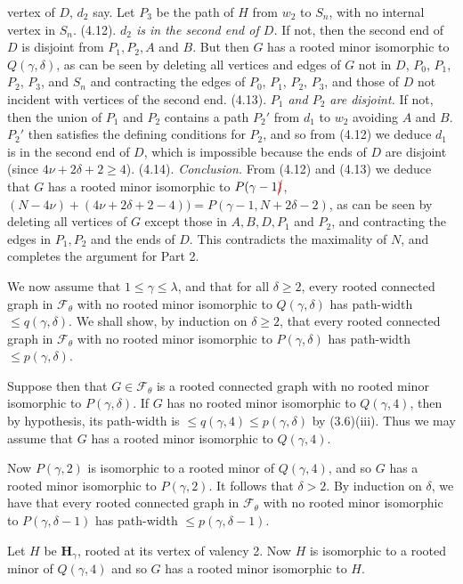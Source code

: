 \noindent vertex of $D$, $d_2$ say. Let $P_3$ be the path of $H$ from $w_2$ to $S_n$, with no internal
vertex in $S_n$.
\stmt
(4.12). \textit{$d_2$ is in the second end of $D$.}
\stmt
If not, then the second end of $D$ is disjoint from $P_1, P_2, A$ and $B$. But then
$G$ has a rooted minor isomorphic to $Q(\gamma, \delta)$, as can be seen by deleting all
vertices and edges of $G$ not in $D$, $P_0$, $P_1$, $P_2$, $P_3$, and $S_n$ and contracting the
edges of $P_0$, $P_1$, $P_2$, $P_3$, and those of $D$ not incident with vertices of the
second end.
\stmt
(4.13). \textit{$P_1$ and $P_2$ are disjoint.}
\stmt
If not, then the union of $P_1$ and $P_2$ contains a path $P_2'$ from $d_1$ to $w_2$
avoiding $A$ and $B$. $P_2'$ then satisfies the defining conditions for $P_2$, and so
from (4.12) we deduce $d_1$ is in the second end of $D$, which is impossible
because the ends of $D$ are disjoint (since $4\nu+2\delta+2\ge 4$).
\stmt
(4.14). \textit{Conclusion.}
\stmt
From (4.12) and (4.13) we deduce that $G$ has a rooted minor isomorphic
to $P(\gamma-1\delm{)}$, $(N-4\nu)+(4\nu+2\delta+2-4))=P(\gamma-1, N+2\delta-2)$, as can be
seen by deleting all vertices of $G$ except those in $A, B, D, P_1$ and $P_2$, and
contracting the edges in $P_1, P_2$ and the ends of $D$. This contradicts the
maximality of $N$, and completes the argument for Part 2.


We now assume that $1\le\gamma\le\lambda$, and that for all $\delta\ge 2$, every rooted
connected graph in $\mathscr{F}_\theta$ with no rooted minor isomorphic to $Q(\gamma, \delta)$ has path-width
${\le}q(\gamma, \delta)$. We shall show, by induction on $\delta\ge 2$, that every rooted
connected graph in $\mathscr{F}_\theta$ with no rooted minor isomorphic to $P(\gamma, \delta)$ has path-width
${\le}p(\gamma, \delta)$.

Suppose then that $G\in\mathscr{F}_\theta$ is a rooted connected graph with no rooted
minor isomorphic to $P(\gamma, \delta)$. If $G$ has no rooted minor isomorphic to $Q(\gamma, 4)$,
then by hypothesis, its path-width is ${\le}q(\gamma, 4)\le p(\gamma, \delta)$ by (3.6)(iii). Thus we
may assume that $G$ has a rooted minor isomorphic to $Q(\gamma, 4)$.

Now $P(\gamma, 2)$ is isomorphic to a rooted minor of $Q(\gamma, 4)$, and so $G$ has a
rooted minor isomorphic to $P(\gamma, 2)$. It follows that $\delta>2$. By induction on $\delta$,
we have that every rooted connected graph in $\mathscr{F}_\theta$ with no rooted minor
isomorphic to $P(\gamma, \delta-1)$ has path-width ${\le}p(\gamma, \delta-1)$.

Let $H$ be $\mathbf{H}_\gamma$, rooted at its vertex of valency 2. Now $H$ is isomorphic to a
rooted minor of $Q(\gamma, 4)$ and so $G$ has a rooted minor isomorphic to $H$.
